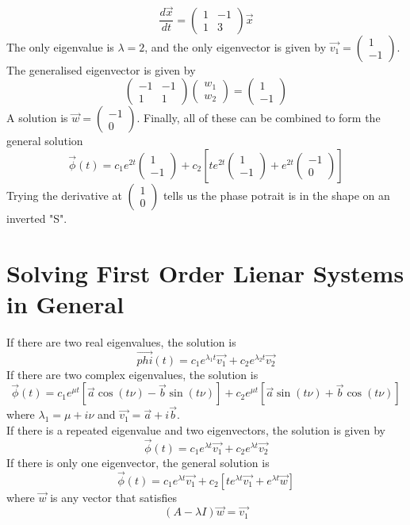 \documentclass[12pt]{article}
\begin{document}
\begin{ex}
	$$\frac{d\vec{x}}{dt} = \begin{pmatrix} 1 & -1 \\ 1 & 3\end{pmatrix}\vec{x}$$
	The only eigenvalue is $\lambda=2$, and the only eigenvector is given by $\vec{v_1} = \begin{pmatrix} 1 \\ -1\end{pmatrix}$. The generalised eigenvector is given by
	$$\begin{pmatrix} -1 & -1 \\ 1 & 1\end{pmatrix}\begin{pmatrix}w_1 \\ w_2\end{pmatrix} = \begin{pmatrix} 1 \\ -1\end{pmatrix}$$
	A solution is $\vec{w} = \begin{pmatrix} -1 \\ 0\end{pmatrix}$. Finally, all of these can be combined to form the general solution
	$$\vec{\phi}(t) = c_1e^{2t}\begin{pmatrix} 1 \\ -1\end{pmatrix} + c_2\left[te^{2t}\begin{pmatrix} 1 \\ -1\end{pmatrix} + e^{2t}\begin{pmatrix}-1 \\ 0\end{pmatrix}\right]$$
	Trying the derivative at $\begin{pmatrix} 1 \\ 0\end{pmatrix}$ tells us the phase potrait is in the shape on an inverted "S".
\end{ex}

\section{Solving First Order Lienar Systems in General}
If there are two real eigenvalues, the solution is
$$\vec{phi}(t) = c_1e^{\lambda_1 t}\vec{v_1} + c_2e^{\lambda_2 t}\vec{v_2}$$
If there are two complex eigenvalues, the solution is
$$\vec{\phi}(t) = c_1e^{\mu t}\left[\vec{a}\cos(t\nu)-\vec{b}\sin(t\nu)\right] + c_2e^{\mu t}\left[\vec{a}\sin(t\nu)+\vec{b}\cos(t\nu)\right]$$
where $\lambda_1 = \mu+i\nu$ and $\vec{v_1} = \vec{a}+i\vec{b}$. \\
If there is a repeated eigenvalue and two eigenvectors, the solution is given by
$$\vec{\phi}(t) = c_1e^{\lambda t}\vec{v_1} + c_2e^{\lambda t}\vec{v_2}$$
If there is only one eigenvector, the general solution is 
$$\vec{\phi}(t) = c_1e^{\lambda t}\vec{v_1} + c_2\left[te^{\lambda t}\vec{v_1} + e^{\lambda t}\vec{w}\right]$$
where $\vec{w}$ is any vector that satisfies
$$(A-\lambda I)\vec{w} = \vec{v_1}$$
\end{document}
